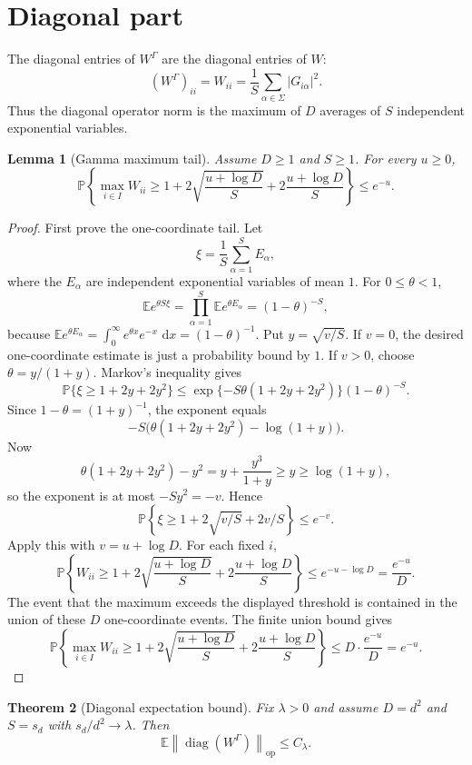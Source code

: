 \documentclass[11pt,oneside]{book}
\newtheorem{theorem}{Theorem}[chapter]
\newtheorem{lemma}[theorem]{Lemma}
\DeclareMathOperator{\diag}{diag}
\newcommand{\E}{\mathbb E}
\newcommand{\Prob}{\mathbb P}
\newcommand{\1}{\mathbf 1}
\newcommand{\pt}{\Gamma}
\newcommand{\op}{\mathrm{op}}
\newcommand{\dd}{\,\mathrm d}
\newcommand{\norm}[1]{\left\|#1\right\|}
\begin{document}
\section{Diagonal part}

The diagonal entries of \(W^\pt\) are the diagonal entries of \(W\):
\[
  (W^\pt)_{ii}=W_{ii}=\frac1S\sum_{\alpha\in\Sigma}|G_{i\alpha}|^2.
\]
Thus the diagonal operator norm is the maximum of \(D\) averages of \(S\)
independent exponential variables.

\begin{lemma}[Gamma maximum tail]
Assume \(D\ge1\) and \(S\ge1\).  For every \(u\ge0\),
\[
  \Prob\left\{
    \max_{i\in I}W_{ii}
    \ge 1+2\sqrt{\frac{u+\log D}{S}}
       +2\frac{u+\log D}{S}
  \right\}\le e^{-u}.
\]
\end{lemma}

\begin{proof}
First prove the one-coordinate tail.  Let
\[
  \xi=\frac1S\sum_{\alpha=1}^S E_\alpha,
\]
where the \(E_\alpha\) are independent exponential variables of mean \(1\).
For \(0\le\theta<1\),
\[
  \E e^{\theta S\xi}
  =
  \prod_{\alpha=1}^S\E e^{\theta E_\alpha}
  =
  (1-\theta)^{-S},
\]
because \(\E e^{\theta E_\alpha}=\int_0^\infty e^{\theta x}e^{-x}\,\dd x
=(1-\theta)^{-1}\).  Put \(y=\sqrt{v/S}\).  If \(v=0\), the desired
one-coordinate estimate is just a probability bound by \(1\).  If \(v>0\),
choose \(\theta=y/(1+y)\).  Markov's inequality gives
\[
  \Prob\{\xi\ge1+2y+2y^2\}
  \le
  \exp\{-S\theta(1+2y+2y^2)\}(1-\theta)^{-S}.
\]
Since \(1-\theta=(1+y)^{-1}\), the exponent equals
\[
  -S\bigl(\theta(1+2y+2y^2)-\log(1+y)\bigr).
\]
Now
\[
  \theta(1+2y+2y^2)-y^2
  =
  y+\frac{y^3}{1+y}
  \ge y
  \ge\log(1+y),
\]
so the exponent is at most \(-Sy^2=-v\).  Hence
\[
  \Prob\left\{\xi\ge1+2\sqrt{v/S}+2v/S\right\}\le e^{-v}.
\]
Apply this with \(v=u+\log D\).  For each fixed \(i\),
\[
  \Prob\left\{W_{ii}\ge
    1+2\sqrt{\frac{u+\log D}{S}}
       +2\frac{u+\log D}{S}
  \right\}
  \le e^{-u-\log D}=\frac{e^{-u}}{D}.
\]
The event that the maximum exceeds the displayed threshold is contained in
the union of these \(D\) one-coordinate events.  The finite union bound gives
\[
  \Prob\left\{\max_{i\in I}W_{ii}\ge
    1+2\sqrt{\frac{u+\log D}{S}}
       +2\frac{u+\log D}{S}
  \right\}
  \le
  D\cdot\frac{e^{-u}}{D}=e^{-u}.
\]
\end{proof}

\begin{theorem}[Diagonal expectation bound]
Fix \(\lambda>0\) and assume \(D=d^2\) and \(S=s_d\) with
\(s_d/d^2\to\lambda\).  Then
\[
  \E\norm{\diag(W^\pt)}_{\op}\le C_\lambda.
\]
\end{theorem}
\end{document}

